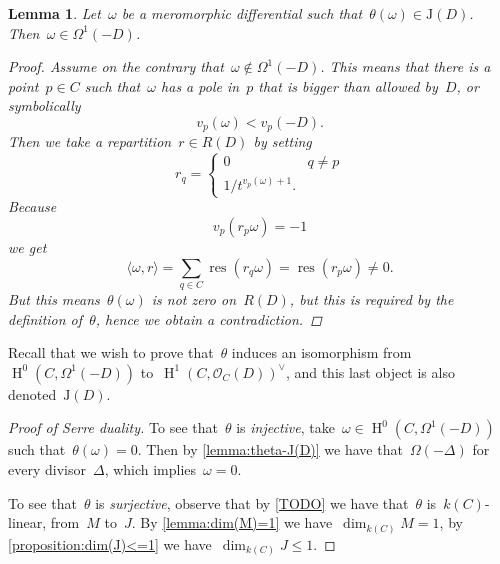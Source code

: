 \documentclass[10pt,a4paper]{article}
\theoremstyle{lecture}
\newtheorem{lemma}[theorem]{Lemma}
\newcommand\dash{\nobreakdash-\hspace{0pt}}
\DeclareMathOperator\HH{H}
\DeclareMathOperator\res{res}
\begin{document}
\begin{lemma}
  \label{lemma:TODO}
  Let~$\omega$ be a meromorphic differential such that~$\theta(\omega)\in\mathrm{J}(D)$. Then~$\omega\in\Omega^1(-D)$.

  \begin{proof}
    Assume on the contrary that~$\omega\notin\Omega^1(-D)$. This means that there is a point~$p\in C$ such that~$\omega$ has a pole in~$p$ that is bigger than allowed by~$D$, or symbolically
    \begin{equation}
      v_p(\omega)<v_p(-D).
    \end{equation}
    Then we take a repartition~$r\in R(D)$ by setting
    \begin{equation}
      r_q=
      \begin{cases}
        0 & q\neq p \\
        1/t^{v_p(\omega)+1}.
      \end{cases}
    \end{equation}
    Because
    \begin{equation}
      v_p(r_p\omega)=-1
    \end{equation}
    we get
    \begin{equation}
      \langle\omega,r\rangle=\sum_{q\in C}\res(r_q\omega)=\res(r_p\omega)\neq 0.
    \end{equation}
    But this means~$\theta(\omega)$ is not zero on~$R(D)$, but this is required by the definition of~$\theta$, hence we obtain a contradiction.
  \end{proof}
\end{lemma}

Recall that we wish to prove that~$\theta$ induces an isomorphism from~$\HH^0(C,\Omega^1(-D))$ to~$\HH^1(C,\mathcal{O}_C(D))^\vee$, and this last object is also denoted~$\mathrm{J}(D)$.
\begin{proof}[Proof of Serre duality]
  To see that~$\theta$ is \emph{injective}, take~$\omega\in\HH^0(C,\Omega^1(-D))$ such that~$\theta(\omega)=0$. Then by \cref{lemma:theta-J(D)} we have that~$\Omega(-\Delta)$ for every divisor~$\Delta$, which implies~$\omega=0$\expand.

  To see that~$\theta$ is \emph{surjective}, observe that by \cref{TODO} we have that~$\theta$ is~$k(C)$\dash linear, from~$M$ to~$J$. By \cref{lemma:dim(M)=1} we have~$\dim_{k(C)}M=1$, by \cref{proposition:dim(J)<=1} we have~$\dim_{k(C)}J\leq 1$.
\end{proof}
\end{document}
